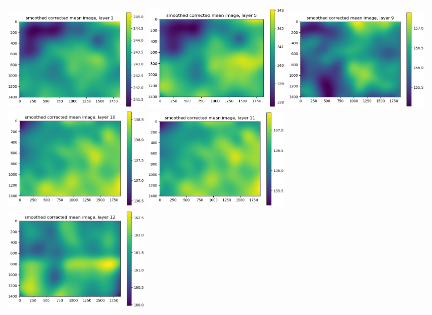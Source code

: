 \documentclass[letterpaper,11pt]{article}
\begin{document}
\begin{figure}[!ht]
\centering
\includegraphics[width=0.32\textwidth]{images/results/smoothed_corrected_mean_image_layers_polaris/smoothed_corrected_mean_image_layer_1}
\includegraphics[width=0.32\textwidth]{images/results/smoothed_corrected_mean_image_layers_polaris/smoothed_corrected_mean_image_layer_5}
\includegraphics[width=0.32\textwidth]{images/results/smoothed_corrected_mean_image_layers_polaris/smoothed_corrected_mean_image_layer_9}
\includegraphics[width=0.32\textwidth]{images/results/smoothed_corrected_mean_image_layers_polaris/smoothed_corrected_mean_image_layer_10}
\includegraphics[width=0.32\textwidth]{images/results/smoothed_corrected_mean_image_layers_polaris/smoothed_corrected_mean_image_layer_11} \\
\includegraphics[width=0.32\textwidth]{images/results/smoothed_corrected_mean_image_layers_polaris/smoothed_corrected_mean_image_layer_12}

\end{figure}
\end{document}
